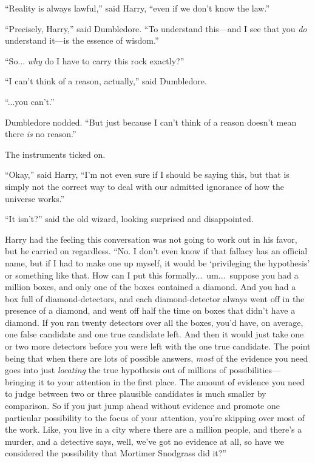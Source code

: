 “Reality is always lawful,” said Harry, “even if we don’t know the law.”

“Precisely, Harry,” said Dumbledore. “To understand this—and I see that you \emph{do} understand it—is the essence of wisdom.”

“So... \emph{why} do I have to carry this rock exactly?”

“I can’t think of a reason, actually,” said Dumbledore.

“...you can’t.”

Dumbledore nodded. “But just because I can’t think of a reason doesn’t mean there \emph{is} no reason.”

The instruments ticked on.

“Okay,” said Harry, “I’m not even sure if I should be saying this, but that is simply not the correct way to deal with our admitted ignorance of how the universe works.”

“It isn’t?” said the old wizard, looking surprised and disappointed.

Harry had the feeling this conversation was not going to work out in his favor, but he carried on regardless. “No. I don’t even know if that fallacy has an official name, but if I had to make one up myself, it would be ‘privileging the hypothesis’ or something like that. How can I put this formally...\ um...\ suppose you had a million boxes, and only one of the boxes contained a diamond. And you had a box full of diamond-detectors, and each diamond-detector always went off in the presence of a diamond, and went off half the time on boxes that didn’t have a diamond. If you ran twenty detectors over all the boxes, you’d have, on average, one false candidate and one true candidate left. And then it would just take one or two more detectors before you were left with the one true candidate. The point being that when there are lots of possible answers, \emph{most} of the evidence you need goes into just \emph{locating} the true hypothesis out of millions of possibilities—bringing it to your attention in the first place. The amount of evidence you need to judge between two or three plausible candidates is much smaller by comparison. So if you just jump ahead without evidence and promote one particular possibility to the focus of your attention, you’re skipping over most of the work. Like, you live in a city where there are a million people, and there’s a murder, and a detective says, well, we’ve got no evidence at all, so have we considered the possibility that Mortimer Snodgrass did it?”

